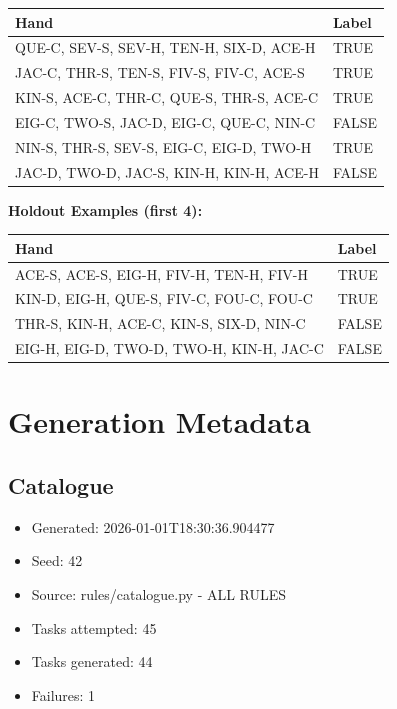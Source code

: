 \documentclass[10pt,a4paper]{article}
\begin{document}
\begin{small}
\begin{tabular}{p{8cm}l}
\toprule
Hand & Label \\
\midrule
QUE-C, SEV-S, SEV-H, TEN-H, SIX-D, ACE-H & \textcolor{positive}{TRUE} \\
JAC-C, THR-S, TEN-S, FIV-S, FIV-C, ACE-S & \textcolor{positive}{TRUE} \\
KIN-S, ACE-C, THR-C, QUE-S, THR-S, ACE-C & \textcolor{positive}{TRUE} \\
EIG-C, TWO-S, JAC-D, EIG-C, QUE-C, NIN-C & \textcolor{negative}{FALSE} \\
NIN-S, THR-S, SEV-S, EIG-C, EIG-D, TWO-H & \textcolor{positive}{TRUE} \\
JAC-D, TWO-D, JAC-S, KIN-H, KIN-H, ACE-H & \textcolor{negative}{FALSE} \\
\bottomrule
\end{tabular}
\end{small}

\textbf{Holdout Examples (first 4):}

\begin{small}
\begin{tabular}{p{8cm}l}
\toprule
Hand & Label \\
\midrule
ACE-S, ACE-S, EIG-H, FIV-H, TEN-H, FIV-H & \textcolor{positive}{TRUE} \\
KIN-D, EIG-H, QUE-S, FIV-C, FOU-C, FOU-C & \textcolor{positive}{TRUE} \\
THR-S, KIN-H, ACE-C, KIN-S, SIX-D, NIN-C & \textcolor{negative}{FALSE} \\
EIG-H, EIG-D, TWO-D, TWO-H, KIN-H, JAC-C & \textcolor{negative}{FALSE} \\
\bottomrule
\end{tabular}
\end{small}

\vspace{0.5cm}

\section{Generation Metadata}

\subsection{Catalogue}

\begin{itemize}
\item Generated: 2026-01-01T18:30:36.904477
\item Seed: 42
\item Source: rules/catalogue.py - ALL RULES
\item Tasks attempted: 45
\item Tasks generated: 44
\item Failures: 1
\end{itemize}
\end{document}
